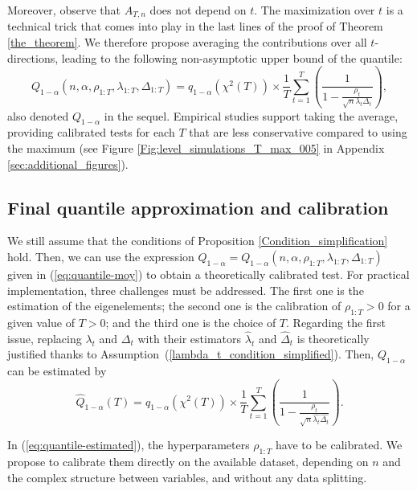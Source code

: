 \documentclass[twoside,11pt]{article}
\newcommand{\nb}{n}
\newcommand{\trueq}[1]{q_{1-\alpha}(#1) }
\newcommand{\qmajfin}{Q}
\newcommand{\hatqmajfin}{\widehat{Q}}
\begin{document}
Moreover, observe that $A_{T,n}$ does not depend on $t$. The maximization over $t$ is a technical trick that comes into play in the last lines of the proof of Theorem \ref{the_theorem}. We therefore propose averaging the contributions over all $t$-directions, leading to the following non-asymptotic upper bound of the quantile:
\begin{equation}
\label{eq:quantile-moy}
\qmajfin_{1-\alpha}\left(\nb,\alpha, \rho_{1:T},\lambda_{1:T},\Delta_{1:T}\right) =\trueq{\chi^2(T)} \times \frac{1}{T}\sum_{t=1}^T\left( \frac{1}{1 - \frac{\rho_t}{\sqrt{\nb} \lambda_t \Delta_t}} \right),
\end{equation}
also denoted $\qmajfin_{1-\alpha}$  in the sequel. Empirical studies support taking the average, providing calibrated tests for each $T$ that are less conservative compared to using the maximum (see Figure \ref{Fig:level_simulations_T_max_005} in Appendix \ref{sec:additional_figures}).

\subsection{Final quantile approximation and calibration} 
\label{subs:finalquantilecalib}
We still assume that the conditions of Proposition \ref{Condition_simplification} hold. Then, we can use the expression $\qmajfin_{1-\alpha} =\qmajfin_{1-\alpha}\left(\nb,\alpha, \rho_{1:T},\lambda_{1:T},\Delta_{1:T}\right)$ given in (\ref{eq:quantile-moy}) to obtain a theoretically calibrated test. For practical implementation, three challenges must be addressed. The first one is the estimation of the eigenelements; the second one is the calibration of $\rho_{1:T} >0$ for a given value of $T>0$; and the third one is the choice of $T$. Regarding the first issue, replacing $\lambda_t$ and $\Delta_t$ with their estimators $\widehat{\lambda}_t$ and $\widehat{\Delta}_t$ is theoretically justified thanks to Assumption~(\ref{lambda_t_condition_simplified}). Then, $\qmajfin_{1-\alpha}$ can be estimated by
\begin{equation}
\label{eq:quantile-estimated}
\hatqmajfin_{1-\alpha}(T)=\trueq{\chi^2(T)} \times \frac{1}{T}\sum_{t=1}^T\left( \frac{1}{1 - \frac{\rho_t}{\sqrt{\nb} \widehat{\lambda_t} \widehat{\Delta_t}}} \right).
\end{equation}

In (\ref{eq:quantile-estimated}), the hyperparameters $\rho_{1:T}$ have to be calibrated. We propose to calibrate them directly on the available dataset, depending on $\nb$ and the complex structure between variables, and without any data splitting. 
\end{document}
